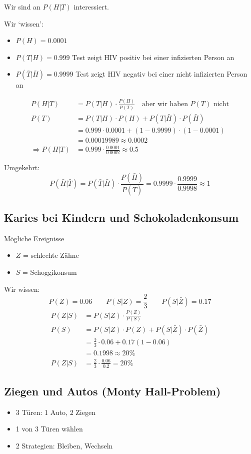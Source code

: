 \documentclass[10pt,a4paper]{scrartcl}
\begin{document}
Wir sind an $P(H|T)$ interessiert.

Wir `wissen':
\begin{itemize}
\item $P(H) = 0.0001$
\item $P(T|H) = 0.999$ Test zeigt HIV positiv bei einer infizierten Person an
\item $P(\bar{T}|\bar{H}) = 0.9999$ Test zeigt HIV negativ bei einer nicht infizierten Person an
\end{itemize}

\begin{align*} %
P(H|T) &= P(T|H) \cdot \frac{P(H)}{P(T)} \quad\text{aber wir haben } P(T) \text{ nicht} \\
P(T) &= P(T|H) \cdot P(H) + P(T|\bar{H}) \cdot P(\bar{H}) \\
	 &= 0.999 \cdot 0.0001 + (1-0.9999) \cdot (1-0.0001) \\
	 &= 0.00019989 \approx 0.0002 \\
\Rightarrow P(H|T) &= 0.999 \cdot \frac{0.0001}{0.0002} \approx 0.5
\end{align*}

Umgekehrt:
$$P(\bar{H}|\bar{T}) = P(\bar{T}|\bar{H}) \cdot \frac{P(\bar{H})}{P(\bar{T})}
 = 0.9999 \cdot \frac{0.9999}{0.9998} \approx 1$$

\subsection{Karies bei Kindern und Schokoladenkonsum}
Mögliche Ereignisse
\begin{itemize}
\item $Z$ = {schlechte Zähne}
\item $S$ = {Schoggikonsum}
\end{itemize}

Wir wissen:
$$P(Z) = 0.06 \qquad P(S|Z) = \frac{2}{3} \qquad P(S|\bar{Z}) = 0.17$$
\begin{align*}
P(Z|S) & = P(S|Z) \cdot \frac{P(Z)}{P(S)} \\
 P(S) & = P(S|Z) \cdot P(Z) + P(S|\bar{Z}) \cdot P(\bar{Z}) \\
 & = \frac{2}{3} \cdot 0.06 + 0.17 (1-0.06) \\
 & = 0.1998 \approx 20\% \\
 P(Z|S) &= \frac{2}{3} \cdot \frac{0.06}{0.2} = 20\%
\end{align*}

\subsection{Ziegen und Autos (Monty Hall-Problem)}
\begin{itemize}
\item 3 Türen: 1 Auto, 2 Ziegen
\item 1 von 3 Türen wählen
\item 2 Strategien: Bleiben, Wechseln
\end{itemize}
\end{document}
